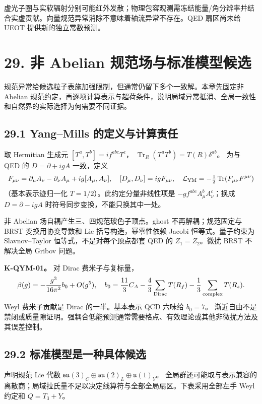 \documentclass[
  11pt,
  oneside]{book}
\begin{document}
虚光子圈与实软辐射分别可能红外发散；物理包容观测需冻结能量/角分辨率并结合实虚贡献。向量规范异常消除不意味着轴流异常不存在。QED
扇区尚未给 UEOT 提供新的独立常数预测。

\chapter{29. 非 Abelian 规范场与标准模型候选}\label{ch-29}\hypertarget{ch-29}{}

规范异常给候选粒子表施加强限制，但通常仍留下多个一致解。本章先固定非
Abelian
规范约定，再逐项计算表示与超荷条件，说明局域异常抵消、全局一致性和自然界的实际选择为何需要不同证据。

\section{29.1 Yang--Mills 的定义与计算责任}

取 Hermitian 生成元 \([T^a,T^b]=if^{abc}T^c\)，
\(\operatorname{Tr}_R(T^aT^b)=T(R)\delta^{ab}\)。 为与 QED 的
\(D=\partial+igA\) 一致，定义 \[
F_{\mu\nu}=\partial_\mu A_\nu-\partial_\nu A_\mu+ig[A_\mu,A_\nu],
\quad [D_\mu,D_\nu]=igF_{\mu\nu},
\quad\mathcal L_{\rm YM}=-\tfrac12\operatorname{Tr}(F_{\mu\nu}F^{\mu\nu})
\] （基本表示迹归一化 \(T=1/2\)）。此约定分量非线性项是
\(-g f^{abc}A_\mu^bA_\nu^c\)；换成 \(D=\partial-igA\)
时符号同步变换，不能只换其中一处。

非 Abelian 场自耦产生三、四规范玻色子顶点。ghost 不再解耦；规范固定与
BRST 变换用协变导数和 Lie 括号构造，幂零性依赖 Jacobi 恒等式。量子约束为
Slavnov--Taylor 恒等式，不是对每个顶点都套 QED 的 \(Z_1=Z_2\)。微扰 BRST
不解决全局 Gribov 问题。

\textbf{K-QYM-01。} 对 Dirac 费米子与复标量， \[
\beta(g)=-\frac{g^3}{16\pi^2}b_0+O(g^5),\quad
b_0=\frac{11}{3}C_A-\frac43\sum_{\rm Dirac}T(R_f)
-\frac13\sum_{\rm complex}T(R_s).
\] Weyl 费米子贡献是 Dirac 的一半。基本表示 QCD 六味给 \(b_0=7\)。
渐近自由不是禁闭或质量隙证明。强耦合低能预测通常需要格点、有效理论或其他非微扰方法及其误差控制。

\section{29.2 标准模型是一种具体候选}

声明规范 Lie 代数
\(\mathfrak{su}(3)_C\oplus\mathfrak{su}(2)_L\oplus\mathfrak u(1)_Y\)。
全局群还可能取与表示兼容的离散商；局域拉氏量不足以决定线算符与全部全局扇区。下表采用全部左手
Weyl 约定和 \(Q=T_3+Y\)。
\end{document}
